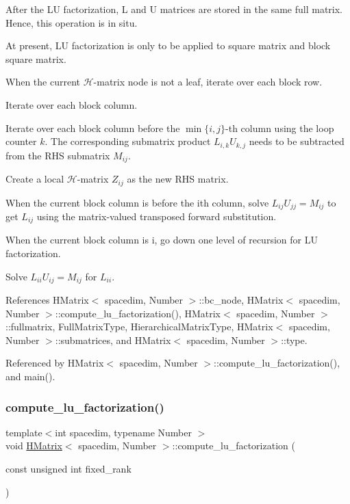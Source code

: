 After the LU factorization, L and U matrices are stored in the same full matrix. Hence, this operation is in situ.

At present, LU factorization is only to be applied to square matrix and block square matrix.

When the current $\mathcal{H}$-\/matrix node is not a leaf, iterate over each block row.

Iterate over each block column.

Iterate over each block column before the $\min\{i, j\}$-\/th column using the loop counter $k$. The corresponding submatrix product $L_{i,k}U_{k,j}$ needs to be subtracted from the R\+HS submatrix $M_{ij}$.

Create a local $\mathcal{H}$-\/matrix $Z_{ij}$ as the new R\+HS matrix.

When the current block column is before the i\textquotesingle{}th column, solve $L_{ij} U_{jj}=M_{ij}$ to get $L_{ij}$ using the matrix-\/valued transposed forward substitution.

When the current block column is i, go down one level of recursion for LU factorization.

Solve $L_{ii}U_{ij}=M_{ij}$ for $L_{ii}$.

References H\+Matrix$<$ spacedim, Number $>$\+::bc\+\_\+node, H\+Matrix$<$ spacedim, Number $>$\+::compute\+\_\+lu\+\_\+factorization(), H\+Matrix$<$ spacedim, Number $>$\+::fullmatrix, Full\+Matrix\+Type, Hierarchical\+Matrix\+Type, H\+Matrix$<$ spacedim, Number $>$\+::submatrices, and H\+Matrix$<$ spacedim, Number $>$\+::type.



Referenced by H\+Matrix$<$ spacedim, Number $>$\+::compute\+\_\+lu\+\_\+factorization(), and main().

\mbox{\label{classHMatrix_aba14c63550f42d8a971beab340337b0e}} 
\subsubsection{\texorpdfstring{compute\+\_\+lu\+\_\+factorization()}{compute\_lu\_factorization()}\hspace{0.1cm}{\footnotesize\ttfamily [2/2]}}
{\footnotesize\ttfamily template$<$int spacedim, typename Number $>$ \\
void \hyperlink{classHMatrix}{H\+Matrix}$<$ spacedim, Number $>$\+::compute\+\_\+lu\+\_\+factorization (\begin{DoxyParamCaption}\item[{const unsigned int}]{fixed\+\_\+rank }\end{DoxyParamCaption})}

